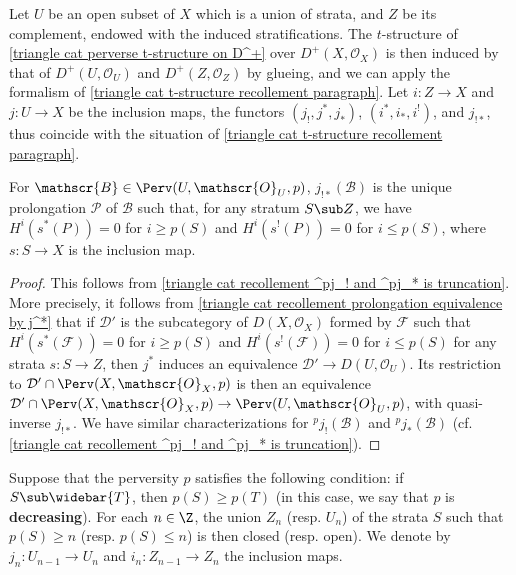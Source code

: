 \begin{remark}
Let $U$ be an open subset of $X$ which is a union of strata, and $Z$ be its complement, endowed with the induced stratifications. The $t$-structure of \cref{triangle cat perverse t-structure on D^+} over $D^+(X,\mathscr{O}_X)$ is then induced by that of $D^+(U,\mathscr{O}_U)$ and $D^+(Z,\mathscr{O}_Z)$ by glueing, and we can apply the formalism of \ref{triangle cat t-structure recollement paragraph}. Let $i:Z\to X$ and $j:U\to X$ be the inclusion maps, the functors $(j_!,j^*,j_*)$, $(i^*,i_*,i^!)$, and $j_{!*}$, thus coincide with the situation of \ref{triangle cat t-structure recollement paragraph}.
\end{remark}

\begin{proposition}\label{triangle cat perverse t-structure j_!* prolongation char}
For $\mathscr{B}\in\Perv(U,\mathscr{O}_U,p)$, $j_{!*}(\mathscr{B})$ is the unique prolongation $\mathscr{P}$ of $\mathscr{B}$ such that, for any stratum $S\sub Z$, we have $H^i(s^*(P))=0$ for $i\geq p(S)$ and $H^i(s^!(P))=0$ for $i\leq p(S)$, where $s:S\to X$ is the inclusion map.
\end{proposition}
\begin{proof}
This follows from \cref{triangle cat recollement ^pj_! and ^pj_* is truncation}. More precisely, it follows from \cref{triangle cat recollement prolongation equivalence by j^*} that if $\mathcal{D}'$ is the  subcategory of $D(X,\mathscr{O}_X)$ formed by $\mathscr{F}$ such that $H^i(s^*(\mathscr{F}))=0$ for $i\geq p(S)$ and $H^i(s^!(\mathscr{F}))=0$ for $i\leq p(S)$ for any strata $s:S\to Z$, then $j^*$ induces an equivalence $\mathcal{D}'\to D(U,\mathscr{O}_U)$. Its restriction to $\mathcal{D}'\cap\Perv(X,\mathscr{O}_X,p)$ is then an equivalence $\mathcal{D}'\cap\Perv(X,\mathscr{O}_X,p)\to \Perv(U,\mathscr{O}_U,p)$, with quasi-inverse $j_{!*}$. We have similar characterizations for ${^pj_!}(\mathscr{B})$ and ${^pj_*}(\mathscr{B})$ (cf. \cref{triangle cat recollement ^pj_! and ^pj_* is truncation}).
\end{proof}

Suppose that the perversity $p$ satisfies the following condition: if $S\sub\widebar{T}$, then $p(S)\geq p(T)$ (in this case, we say that $p$ is \textbf{decreasing}). For each $n\in\Z$, the union $Z_n$ (resp. $U_n$) of the strata $S$ such that $p(S)\geq n$ (resp. $p(S)\leq n$) is then closed (resp. open). We denote by $j_n:U_{n-1}\to U_n$ and $i_n:Z_{n-1}\to Z_n$ the inclusion maps.

